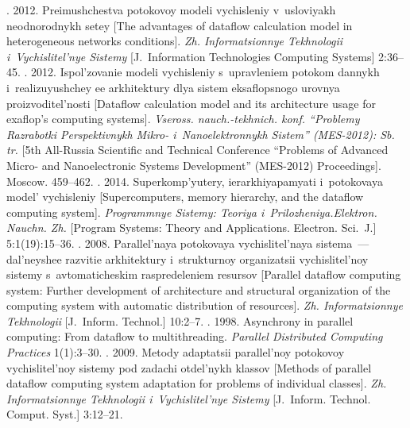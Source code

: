 
  \begin{multicols}{2}

\renewcommand{\bibname}{\protect\rmfamily References}

{\small\frenchspacing
 {%
 \begin{thebibliography}{99}
  . 2012.  
Preimushchestva potokovoy modeli vychisleniy v~usloviyakh neodnorodnykh setey 
[The advantages of dataflow calculation model in heterogeneous networks 
conditions]. \textit{Zh. Informatsionnye Tekhnologii i~Vychislitel'nye Sistemy} 
[J.~Information Technologies Computing Systems] 2:36--45.
  . 2012. 
Ispol'zovanie modeli vychisleniy s~upravleniem potokom dannykh 
i~realizuyushchey ee arkhitektury dlya sistem eksaflopsnogo urovnya 
proizvoditel'nosti [Dataflow calculation model and its architecture usage for 
exa\-flop's 
computing systems]. \textit{Vseross. nauch.-tekhnich. konf. ``Problemy Razrabotki 
Perspektivnykh Mikro- i~Nanoelektronnykh Sistem'' (MES-2012): Sb. tr.} 
[5th All-Russia Scientific and Technical Conference ``Problems of Advanced  
Micro- and Nanoelectronic Systems Development'' (MES-2012) 
Proceedings]. Moscow. 459--462.
  . 2014. Superkomp'yutery, ierarkhiya\linebreak pamyati i~potokovaya 
model' vychisleniy [Supercomputers, memory hierarchy, and the dataflow computing 
system]. \textit{Programmnye Sistemy: Teoriya i~Prilozheniya.\linebreak Elektron. Nauchn. 
Zh.} [Program Systems: Theory and Applications. Electron. Sci.~J.]  5:1(19):15--36.
  . 2008. Parallel'naya potokovaya vychislitel'naya sistema~--- 
dal'neyshee razvitie arkhitektury i~strukturnoy organizatsii vychislitel'noy sistemy 
s~avtomaticheskim raspredeleniem resursov [Parallel dataflow computing system: 
Further development of architecture and structural organization of the computing 
system with automatic distribution of resources]. \textit{Zh. Informatsionnye 
Tekhnologii} [J.~Inform. Technol.] 10:2--7.
  . 1998. Asynchrony in parallel 
computing: From dataflow to multithreading. \textit{Parallel Distributed Computing 
Practices} 1(1):3--30.
  . 2009. Metody adaptatsii parallel'noy potokovoy vychislitel'noy 
sistemy pod zadachi otdel'nykh klassov [Methods of parallel dataflow computing 
system adaptation for problems of individual classes]. \textit{Zh. Informatsionnye 
Tekhnologii i~Vychislitel'nye Sistemy} [J.~Inform. Technol. Comput. 
Syst.] 3:12--21.



\end{thebibliography}}}
\end{multicols}
